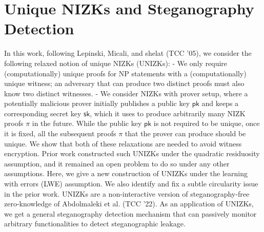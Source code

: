 \documentclass[11pt,oneside]{book}
\theoremstyle{definition}
\theoremstyle{remark}
\theoremstyle{plain}
\begin{document}
\section{\cite{cryptoeprint:2025/1898} Unique NIZKs and Steganography Detection}
In this work, following Lepinski, Micali, and shelat (TCC '05), we consider the following relaxed notion of unique NIZKs (UNIZKs): - We only require (computationally) unique proofs for NP statements with a (computationally) unique witness; an adversary that can produce two distinct proofs must also know two distinct witnesses. - We consider NIZKs with prover setup, where a potentially malicious prover initially publishes a public key $\mathsf{pk}$ and keeps a corresponding secret key $\mathsf{sk}$, which it uses to produce arbitrarily many NIZK proofs $\pi$ in the future. While the public key $\mathsf{pk}$ is not required to be unique, once it is fixed, all the subsequent proofs $\pi$ that the prover can produce should be unique. We show that both of these relaxations are needed to avoid witness encryption. Prior work constructed such UNIZKs under the quadratic residuosity assumption, and it remained an open problem to do so under any other assumptions. Here, we give a new construction of UNIZKs under the learning with errors (LWE) assumption. We also identify and fix a subtle circularity issue in the prior work. UNIZKs are a non-interactive version of steganography-free zero-knowledge of Abdolmaleki et al. (TCC '22). As an application of UNIZKs, we get a general steganography detection mechanism that can passively monitor arbitrary functionalities to detect steganographic leakage.
\end{document}
